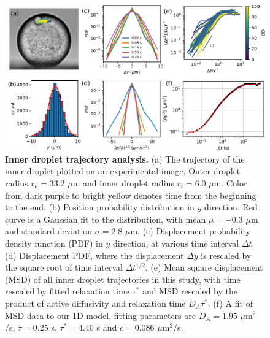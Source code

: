 \documentclass[%
10pt,
superscriptaddress,
twocolumn,
 amsmath,amssymb,
 aps,prx,
]{revtex4-2}
\begin{document}
\begin{figure}[!t]
  \includegraphics[width=\textwidth]{2-traj-analysis}
  \caption{
  \textbf{Inner droplet trajectory analysis.}
  (a) The trajectory of the inner droplet plotted on an experimental image.
  Outer droplet radius $r_o= 33.2$ $\mu$m and inner droplet radius $r_i=6.0$ $\mu$m.
  Color from dark purple to bright yellow denotes time from the beginning to the end.
  (b) Position probability distribution in $y$ direction. Red curve is a Gaussian fit to the distribution, with mean $\mu = -0.3$ $\mu$m and standard deviation $\sigma = 2.8$ $\mu$m.
  (c) Displacement probability density function (PDF) in $y$ direction, at various time interval $\Delta t$.
  (d) Displacement PDF, where the displacement $\Delta y$ is rescaled by the square root of time interval $\Delta t^{1/2}$.
  (e) Mean square displacement (MSD) of all inner droplet trajectories in this study, with time rescaled by fitted relaxation time $\tau^*$ and MSD rescaled by the product of active diffusivity and relaxation time $D_A\tau^*$.
  (f) A fit of MSD data to our 1D model, fitting parameters are $D_A=1.95$ $\mu$m$^2$/s, $\tau=0.25$ s, $\tau^*=4.40$ s and $c=0.086$ $\mu$m$^2$/s.
  }
  \label{fig:traj-analysis}
\end{figure}
\end{document}
